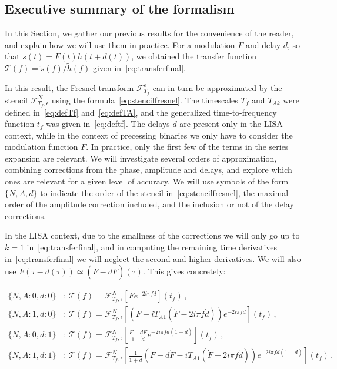\documentclass[aps,showpacs,twocolumn,
prd,superscriptaddress,nofootinbib]{revtex4-1}
\newcommand\calF{{\mathcal{F}}}
\newcommand\calT{{\mathcal{T}}}
\newcommand{\Tf}{T_{f}}
\begin{document}
\subsection{Executive summary of the formalism}\label{subsec:executivesummary}

In this Section, we gather our previous results for the convenience of the reader, and explain how we will use them in practice. For a modulation $F$ and delay $d$, so that $s(t) = F(t) h(t+d(t))$, we obtained the transfer function $\calT (f) = \tilde{s}(f)/\tilde{h}(f)$ given in~\eqref{eq:transferfinal}.

In this result, the Fresnel transform $\calF^{\epsilon}_{\Tf}$ can in turn be approximated by the stencil $\calF^{N}_{\Tf, \epsilon}$ using the formula~\eqref{eq:stencilfresnel}. The timescales $\Tf$ and $T_{Ak}$ were defined in~\eqref{eq:defTf} and~\eqref{eq:defTA}, and the generalized time-to-frequency function $t_{f}$ was given in~\eqref{eq:deftf}. The delays $d$ are present only in the LISA context, while in the context of precessing binaries we only have to consider the modulation function $F$. In practice, only the first few of the terms in the series expansion are relevant. We will investigate several orders of approximation, combining corrections from the phase, amplitude and delays, and explore which ones are relevant for a given level of accuracy. We will use symbols of the form $\{N,A,d\}$ to indicate the order of the stencil in~\eqref{eq:stencilfresnel}, the maximal order of the amplitude correction included, and the inclusion or not of the delay corrections.

In the LISA context, due to the smallness of the corrections we will only go up to $k=1$ in~\eqref{eq:transferfinal}, and in computing the remaining time derivatives in~\eqref{eq:transferfinal} we will neglect the second and higher derivatives. We will also use $F(\tau - d(\tau)) \simeq (F - d \dot{F})(\tau)$. This gives concretely:
\begin{widetext}
\begin{subequations}
\begin{align}
	\{N,A:0,d:0\}&: \; \calT(f) = \calF^{N}_{\Tf, \epsilon} \left[ F e^{-2i\pi f d} \right] (t_{f}) \,, \\
	\{N,A:1,d:0\}&: \; \calT(f) = \calF^{N}_{\Tf, \epsilon} \left[ \left(F - i T_{A1} \left( \dot{F} - 2i\pi f \dot{d}\right) \right) e^{-2i\pi f d} \right] (t_{f}) \,, \\
	\{N,A:0,d:1\}&: \; \calT(f) = \calF^{N}_{\Tf, \epsilon} \left[ \frac{F - d\dot{F}}{1+\dot{d}} e^{-2i\pi f d (1-\dot{d})} \right] (t_{f})\,, \\
	\{N,A:1,d:1\}&: \; \calT(f) = \calF^{N}_{\Tf, \epsilon} \left[ \frac{1}{1+\dot{d}}\left(  F - d\dot{F} - i T_{A1} \left( \dot{F} - 2i\pi f \dot{d} \right) \right) e^{-2i\pi f d (1 - \dot{d})} \right] (t_{f})\,.
\end{align}
\end{subequations}
\end{widetext}
\end{document}
